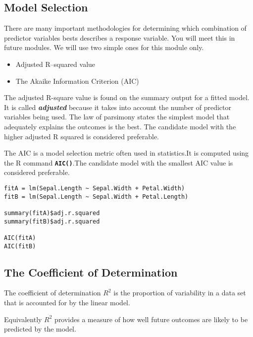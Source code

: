 \documentclass[a4paper,12pt]{article}
\begin{document}
\subsection{Model Selection}
There are many important methodologies for determining which combination of predictor variables bests describes a response variable. You will meet this in future modules.
We will use two simple ones for this module only.
\begin{itemize}
\item Adjusted R–squared value
\item The Akaike Information Criterion (AIC)
\end{itemize}


\noindent The adjusted R-square value is found on the summary output for a fitted model. It is called \textbf{\emph{adjusted}} because it takes into account the number of predictor variables being used. The law of parsimony states the simplest model that adequately explains the outcomes is the best. The candidate model with the higher adjusted R squared is considered preferable.


\noindent The AIC is a model selection metric often used in statistics.It is computed using the R command
\texttt{\textbf{AIC()}}.The candidate model with the smallest AIC value is considered preferable.

\begin{framed}
\begin{verbatim}
fitA = lm(Sepal.Length ~ Sepal.Width + Petal.Width)
fitB = lm(Sepal.Length ~ Sepal.Width + Petal.Length)

summary(fitA)$adj.r.squared
summary(fitB)$adj.r.squared

AIC(fitA)
AIC(fitB)
\end{verbatim}
\end{framed}

 


\subsection{The Coefficient of Determination}
The coefficient of determination $R^2$ is the proportion of variability in a data set that is accounted for by the linear model.

Equivalently $R^2$ provides a measure of how well future outcomes are likely to be predicted by the model.
\end{document}
